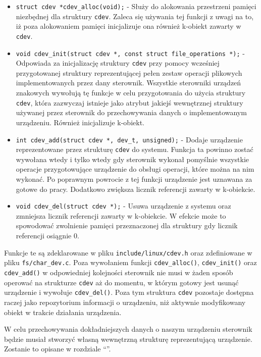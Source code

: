 \documentclass[11pt]{scrartcl}
\begin{document}
\begin{itemize}
\item
  \texttt{struct cdev *cdev\_alloc(void);} - Służy do alokowania przestrzeni pamięci niezbędnej dla struktury \texttt{cdev}. Zaleca się używania tej funkcji z uwagi na to, iż poza alokowaniem pamięci inicjalizuje ona również k-obiekt zawarty w \texttt{cdev}.
\item
  \texttt{void cdev\_init(struct cdev *, const struct file\_operations *);} - \newline Odpowiada za inicjalizację struktury \texttt{cdev} przy pomocy wcześniej przygotowanej struktury reprezentującej pełen zestaw operacji plikowych implementowanych przez dany sterownik. Wszystkie sterowniki urządzeń znakowych wywołują tę funkcje w celu przygotowania do użycia struktury \texttt{cdev}, która zazwyczaj istnieje jako atrybut jakiejś wewnętrznej struktury używanej przez sterownik do przechowywania danych o implementowanym urządzeniu. Również inicjalizuje k-obiekt.
\item
  \texttt{int cdev\_add(struct cdev *, dev\_t, unsigned);} - Dodaje urządzenie reprezentowane przez strukturę \texttt{cdev} do systemu.  Funkcja ta powinno zostać wywołana wtedy i tylko wtedy gdy sterownik wykonał pomyślnie wszystkie operacje przygotowujące urządzenie do obsługi operacji, które można na nim wykonać. Po poprawnym powrocie z tej funkcji urządzenie jest uznawana za gotowe do pracy. Dodatkowo zwiększa licznik referencji zawarty w k-obiekcie.
\item
  \texttt{void cdev\_del(struct cdev *);} - Usuwa urządzenie z systemu oraz zmniejsza licznik referencji zawarty w k-obiekcie. W efekcie może to spowodować zwolnienie pamięci przeznaczonej dla struktury gdy licznik referencji osiągnie 0.
\end{itemize}

Funkcje te są zdeklarowane w pliku \texttt{include/linux/cdev.h} oraz zdefiniowane w pliku \texttt{fs/char\_dev.c}. Poza wywołaniem funkcji \texttt{cdev\_alloc()}, \texttt{cdev\_init()} oraz \texttt{cdev\_add()} w odpowiedniej kolejności sterownik nie musi w żaden sposób operować na strukturze \texttt{cdev} aż do momentu, w którym gotowy jest usunąć urządzenie i wywołuje \texttt{cdev\_del()}. Poza tym struktura \texttt{cdev} pozostaje dostępna raczej jako repozytorium informacji o urządzeniu, niż aktywnie modyfikowany obiekt w trakcie działania urządzenia.

W celu przechowywania dokładniejszych danych o naszym urządzeniu sterownik będzie musiał stworzyć własną wewnętrzną strukturę reprezentującą urządzenie. Zostanie to opisane w rozdziale ``''.
\end{document}
